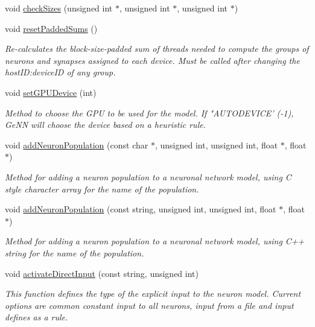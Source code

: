\begin{DoxyCompactItemize}
void \hyperlink{classNNmodel_aa096950a3bb9a7d573df77c26919ab07}{check\+Sizes} (unsigned int $\ast$, unsigned int $\ast$, unsigned int $\ast$)
\item 
void \hyperlink{classNNmodel_a836c19f5ebf90740b18f6291b0c03732}{reset\+Padded\+Sums} ()
\begin{DoxyCompactList}\small\item\em Re-\/calculates the block-\/size-\/padded sum of threads needed to compute the groups of neurons and synapses assigned to each device. Must be called after changing the host\+I\+D\+:device\+I\+D of any group. \end{DoxyCompactList}\item 
void \hyperlink{classNNmodel_ae44b078dcca0b16ef45978a7fe54d16e}{set\+G\+P\+U\+Device} (int)
\begin{DoxyCompactList}\small\item\em Method to choose the G\+P\+U to be used for the model. If "A\+U\+T\+O\+D\+E\+V\+I\+C\+E' (-\/1), Ge\+N\+N will choose the device based on a heuristic rule. \end{DoxyCompactList}\item 
void \hyperlink{classNNmodel_a24532739d3ae98da3e00a9fe5aadd54e}{add\+Neuron\+Population} (const char $\ast$, unsigned int, unsigned int, float $\ast$, float $\ast$)
\begin{DoxyCompactList}\small\item\em Method for adding a neuron population to a neuronal network model, using C style character array for the name of the population. \end{DoxyCompactList}\item 
void \hyperlink{classNNmodel_af52eebfac8ff3cd3eaa4f2cfc0918e3a}{add\+Neuron\+Population} (const string, unsigned int, unsigned int, float $\ast$, float $\ast$)
\begin{DoxyCompactList}\small\item\em Method for adding a neuron population to a neuronal network model, using C++ string for the name of the population. \end{DoxyCompactList}\item 
void \hyperlink{classNNmodel_a95724e1798bd9ac5642a8fb2484a2f93}{activate\+Direct\+Input} (const string, unsigned int)
\begin{DoxyCompactList}\small\item\em This function defines the type of the explicit input to the neuron model. Current options are common constant input to all neurons, input from a file and input defines as a rule. \end{DoxyCompactList}\item 

\end{DoxyCompactItemize}
